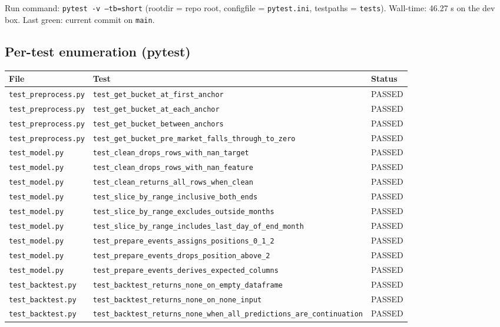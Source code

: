 \documentclass[11pt,a4paper]{article}
\begin{document}
Run command: \texttt{pytest -v --tb=short} (rootdir = repo root, configfile = \texttt{pytest.ini}, testpaths = \texttt{tests}). Wall-time: 46.27 s on the dev box. Last green: current commit on \texttt{main}.

\subsection*{Per-test enumeration (pytest)}

\begin{tabularx}{\linewidth}{@{}lXl@{}}
\toprule
\textbf{File} & \textbf{Test} & \textbf{Status} \\
\midrule
\texttt{test\_preprocess.py} & \texttt{test\_get\_bucket\_at\_first\_anchor}                           & PASSED \\
\texttt{test\_preprocess.py} & \texttt{test\_get\_bucket\_at\_each\_anchor}                            & PASSED \\
\texttt{test\_preprocess.py} & \texttt{test\_get\_bucket\_between\_anchors}                            & PASSED \\
\texttt{test\_preprocess.py} & \texttt{test\_get\_bucket\_pre\_market\_falls\_through\_to\_zero}      & PASSED \\
\texttt{test\_model.py}      & \texttt{test\_clean\_drops\_rows\_with\_nan\_target}                    & PASSED \\
\texttt{test\_model.py}      & \texttt{test\_clean\_drops\_rows\_with\_nan\_feature}                   & PASSED \\
\texttt{test\_model.py}      & \texttt{test\_clean\_returns\_all\_rows\_when\_clean}                   & PASSED \\
\texttt{test\_model.py}      & \texttt{test\_slice\_by\_range\_inclusive\_both\_ends}                  & PASSED \\
\texttt{test\_model.py}      & \texttt{test\_slice\_by\_range\_excludes\_outside\_months}              & PASSED \\
\texttt{test\_model.py}      & \texttt{test\_slice\_by\_range\_includes\_last\_day\_of\_end\_month}    & PASSED \\
\texttt{test\_model.py}      & \texttt{test\_prepare\_events\_assigns\_positions\_0\_1\_2}             & PASSED \\
\texttt{test\_model.py}      & \texttt{test\_prepare\_events\_drops\_position\_above\_2}                & PASSED \\
\texttt{test\_model.py}      & \texttt{test\_prepare\_events\_derives\_expected\_columns}              & PASSED \\
\texttt{test\_backtest.py}   & \texttt{test\_backtest\_returns\_none\_on\_empty\_dataframe}            & PASSED \\
\texttt{test\_backtest.py}   & \texttt{test\_backtest\_returns\_none\_on\_none\_input}                  & PASSED \\
\texttt{test\_backtest.py}   & \texttt{test\_backtest\_returns\_none\_when\_all\_predictions\_are\_continuation} & PASSED \\
\bottomrule
\end{tabularx}
\end{document}
